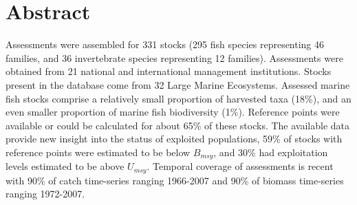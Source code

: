 \section*{Abstract}

Assessments were assembled for 331 stocks
(295 fish species representing
46 families, and 36
invertebrate species representing 12
families). Assessments were obtained from 21 national
and international management institutions. Stocks
present in the database come from 32 Large
Marine Ecosystems. Assessed marine fish stocks
comprise a relatively small proportion of harvested taxa
(18\%), and an even smaller proportion of
marine fish biodiversity (1\%). Reference
points were available or could be calculated for about
65\% of these stocks. The available data
provide new insight into the status of exploited populations,
59\% of stocks with reference points
were estimated to be below $B_{msy}$, and
30\% had exploitation levels
estimated to be above $U_{msy}$. Temporal coverage of assessments is
recent with 90\% of catch time-series ranging 1966-2007
and 90\% of biomass time-series ranging 1972-2007.


